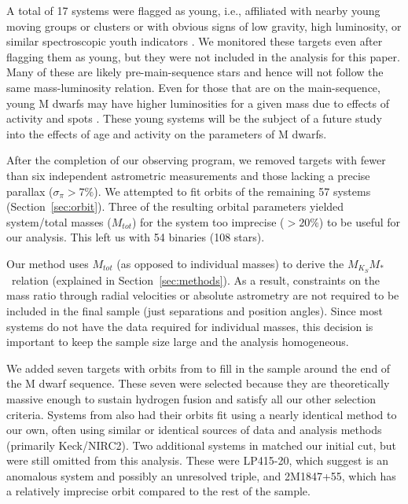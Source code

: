 \documentclass[twocolumn]{aastex62}
\newcommand{\mmk}{$M_{K_S}$\textendash$M_*$}
\begin{document}
A total of 17 systems were flagged as young, i.e., affiliated with nearby young moving groups or clusters or with obvious signs of low gravity, high luminosity, or similar spectroscopic youth indicators \citep{Shkolnik2012, Kraus2014, Gagne2014, Malo2014a, Gagne2015, 2017AJ....153...95R, 2017AJ....154...69S, Rizzuto2017, 2018MNRAS.475.2955L}. We monitored these targets even after flagging them as young, but they were not included in the analysis for this paper. Many of these are likely pre-main-sequence stars and hence will not follow the same mass-luminosity relation. Even for those that are on the main-sequence, young M dwarfs may have higher luminosities for a given mass due to effects of activity and spots \citep[e.g.,][]{2015ApJ...807....3K,Stassun2012,Somers2017}. These young systems will be the subject of a future study into the effects of age and activity on the parameters of M dwarfs. 

After the completion of our observing program, we removed targets with fewer than six independent astrometric measurements and those lacking a precise parallax ($\sigma_{\pi}>7\%$). We attempted to fit orbits of the remaining 57 systems (Section~\ref{sec:orbit}). Three of the resulting orbital parameters yielded system/total masses ($M_{tot}$) for the system too imprecise ($>20\%$) to be useful for our analysis. This left us with 54 binaries (108 stars).

Our method uses $M_{tot}$ (as opposed to individual masses) to derive the \mmk\ relation (explained in Section~\ref{sec:methods}). As a result, constraints on the mass ratio through radial velocities or absolute astrometry are not required to be included in the final sample (just separations and position angles). Since most systems do not have the data required for individual masses, this decision is important to keep the sample size large and the analysis homogeneous. 

We added seven targets with orbits from \citet{Dupuy2017} to fill in the sample around the end of the M dwarf sequence. These seven were selected because they are theoretically massive enough to sustain hydrogen fusion and satisfy all our other selection criteria. Systems from \citet{Dupuy2017} also had their orbits fit using a nearly identical method to our own, often using similar or identical sources of data and analysis methods (primarily Keck/NIRC2). Two additional systems in \citet{Dupuy2017} matched our initial cut, but were still omitted from this analysis. These were LP415-20, which \citet{Dupuy2017} suggest is an anomalous system and possibly an unresolved triple, and 2M1847+55, which has a relatively imprecise orbit compared to the rest of the sample.
\end{document}
